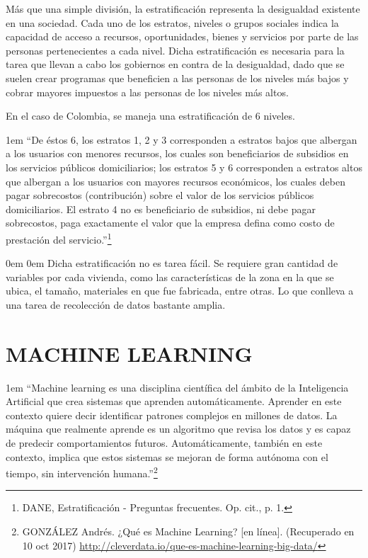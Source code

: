    Más que una simple división, la estratificación representa la desigualdad existente en una sociedad. Cada uno de los estratos, niveles o grupos sociales indica la capacidad de acceso a recursos, oportunidades, bienes y servicios por parte de las personas pertenecientes a cada nivel. Dicha estratificación es necesaria para la tarea que llevan a cabo los gobiernos en contra de la desigualdad, dado que se suelen crear programas que beneficien a las personas de los niveles más bajos y cobrar mayores impuestos a las personas de los niveles más altos.
    
    En el caso de Colombia, se maneja una estratificación de 6 niveles.

	\leftskip1em
	\rightskip\leftskip
	{\footnotesize \hspace{\parindent} “De éstos 6, los estratos 1, 2 y 3 corresponden a estratos bajos que albergan a los usuarios con menores recursos, los cuales son beneficiarios de subsidios en los servicios públicos domiciliarios; los estratos 5 y 6 corresponden a estratos altos que albergan a los usuarios con mayores recursos económicos, los cuales deben pagar sobrecostos (contribución) sobre el valor de los servicios públicos domiciliarios. El estrato 4 no es beneficiario de subsidios, ni debe pagar sobrecostos, paga exactamente el valor que la empresa defina como costo de prestación del servicio.”\footnote[9]{DANE, Estratificación - Preguntas frecuentes. Op. cit., p. 1.}}
	
	\leftskip0em
	\rightskip0em
    Dicha estratificación no es tarea fácil. Se requiere gran cantidad de variables por cada vivienda, como las características de la zona en la que se ubica, el tamaño, materiales en que fue fabricada, entre otras. Lo que conlleva a una tarea de recolección de datos bastante amplia.
    
    
    \section{MACHINE LEARNING}
    
    \leftskip1em
    \rightskip\leftskip
    {\footnotesize \hspace{\parindent}
    “Machine learning es una disciplina científica del ámbito de la Inteligencia Artificial que crea sistemas que aprenden automáticamente. Aprender en este contexto quiere decir identificar patrones complejos en millones de datos. La máquina que realmente aprende es un algoritmo que revisa los datos y es capaz de predecir comportamientos futuros. Automáticamente, también en este contexto, implica que estos sistemas se mejoran de forma autónoma con el tiempo, sin intervención humana.”\footnote[10]{GONZÁLEZ  Andrés. ¿Qué es Machine Learning? [en línea]. (Recuperado en 10 oct 2017) \url{http://cleverdata.io/que-es-machine-learning-big-data/}}}

